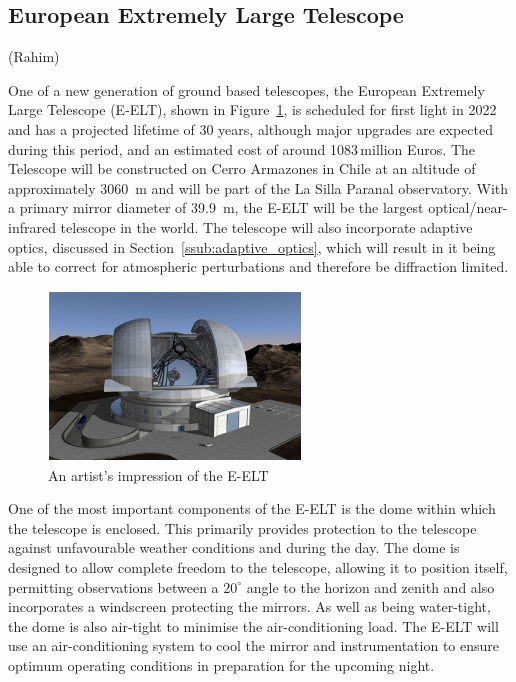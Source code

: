 
\subsection{European Extremely Large Telescope} %
\label{sub:european_extremely_large_telescope}
(Rahim)

	One of a new generation of ground based telescopes, the European Extremely Large Telescope (E-ELT), shown in Figure~\ref{fig:artist_eelt}, is scheduled for first light in 2022 and has a projected lifetime of 30 years, although major upgrades are expected during this period\cite[p.~163]{E_ELT_Construction_Proposal}, and an estimated cost of around 1083\,million Euros. The Telescope will be constructed on Cerro Armazones in Chile at an altitude of approximately \SI{3060}{\metre} and will be part of the La Silla Paranal observatory. With a primary mirror diameter of \SI{39.9}{\metre}, the E-ELT will be the largest optical/near-infrared telescope in the world. The telescope will also incorporate adaptive optics, discussed in Section~\ref{ssub:adaptive_optics}, which will result in it being able to correct for atmospheric perturbations and therefore be diffraction limited.
	\begin{figure}[htbp]
		\centering
		\includegraphics[width=0.6\textwidth]{../Images/E-ELT.png}
		\caption{An artist's impression of the E-ELT\cite{E_ELT_Enclosure}}\label{fig:artist_eelt}
	\end{figure}

	One of the most important components of the E-ELT is the dome within which the telescope is enclosed. This primarily provides protection to the telescope against unfavourable weather conditions and during the day. The dome is designed to allow complete freedom to the telescope, allowing it to position itself, permitting observations between a $20^{\circ}$ angle to the horizon and zenith and also incorporates a windscreen protecting the mirrors. As well as being water-tight, the dome is also air-tight to minimise the air-conditioning load. The E-ELT will use an air-conditioning system to cool the mirror and instrumentation to ensure optimum operating conditions in preparation for the upcoming night.

